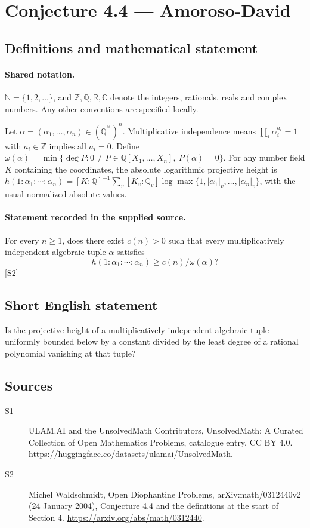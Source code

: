 \documentclass[11pt]{article}
\newcommand{\sref}[2]{\hyperlink{source:#1:#2}{[S#2]}}
\begin{document}
\section{Conjecture 4.4 — Amoroso-David}\label{statement}

\subsection{Definitions and mathematical statement}

\paragraph{Shared notation.}$\mathbb N=\{1,2,\ldots\}$, and $\mathbb Z,\mathbb Q,\mathbb R,\mathbb C$ denote the integers, rationals, reals and complex numbers. Any other conventions are specified locally.


Let $\alpha=(\alpha_1,\ldots,\alpha_n)\in(\overline{\mathbb Q}^{\times})^n$. Multiplicative independence means $\prod_i\alpha_i^{a_i}=1$ with $a_i\in\mathbb Z$ implies all $a_i=0$. Define $\omega(\alpha)=\min\{\deg P:0\ne P\in\mathbb Q[X_1,\ldots,X_n],\ P(\alpha)=0\}$. For any number field $K$ containing the coordinates, the absolute logarithmic projective height is $h(1:\alpha_1:\cdots:\alpha_n)=[K:\mathbb Q]^{-1}\sum_v[K_v:\mathbb Q_v]\log\max\{1,|\alpha_1|_v,\ldots,|\alpha_n|_v\}$, with the usual normalized absolute values.
\paragraph{Statement recorded in the supplied source.}
For every $n\ge1$, does there exist $c(n)>0$ such that every multiplicatively independent algebraic tuple $\alpha$ satisfies \[h(1:\alpha_1:\cdots:\alpha_n)\ge c(n)/\omega(\alpha)?\] \sref{statement}{2}
\subsection{Short English statement}
Is the projective height of a multiplicatively independent algebraic tuple uniformly bounded below by a constant divided by the least degree of a rational polynomial vanishing at that tuple?
\subsection{Sources}
\begin{description}
\item[\hypertarget{source:statement:1}{S1}] ULAM.AI and the UnsolvedMath Contributors, UnsolvedMath: A Curated Collection of Open Mathematics Problems, catalogue entry. CC BY 4.0. \url{https://huggingface.co/datasets/ulamai/UnsolvedMath}.
\item[\hypertarget{source:statement:2}{S2}] Michel Waldschmidt, Open Diophantine Problems, arXiv:math/0312440v2 (24 January 2004), Conjecture 4.4 and the definitions at the start of Section 4. \url{https://arxiv.org/abs/math/0312440}.
\end{description}
\label{end:statement}
\end{document}
